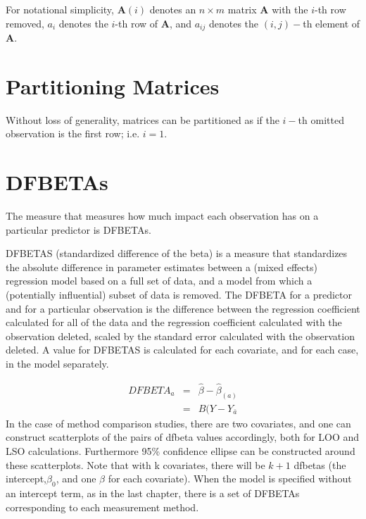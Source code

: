 \documentclass[12pt, a4paper]{report}
\theoremstyle{plain}
\theoremstyle{definition}
\theoremstyle{remark}
\begin{document}
For notational simplicity, $\boldsymbol{A}(i)$ denotes an $n \times m$ matrix $\boldsymbol{A}$ with the $i$-th row
removed, $a_i$ denotes the $i$-th row of $\boldsymbol{A}$, and $a_{ij}$ denotes the $(i, j)-$th element of $\boldsymbol{A}$.

\section{Partitioning Matrices} %
Without loss of generality, matrices can be partitioned as if the $i-$th omitted observation is the first row; i.e. $i=1$.






\section{DFBETAs}
The measure that measures how much impact each observation has on a particular predictor is DFBETAs. 


DFBETAS (standardized difference of the beta) is a measure that standardizes the absolute difference in parameter estimates between a (mixed effects) regression model based on a full set of data, and a model from which a (potentially influential) subset of data is removed. The DFBETA for a predictor and for a particular observation is the difference between the regression coefficient calculated for all of the data and the regression coefficient calculated with the observation deleted, scaled by the standard error calculated with the observation deleted. 
A value for DFBETAS is calculated for each covariate, and for each case, in the model separately.



\begin{eqnarray}
DFBETA_{a} &=& \hat{\beta} - \hat{\beta}_{(a)} \\
&=& B(Y-Y_{\bar{a}}
\end{eqnarray}
In the case of method comparison studies, there are two covariates, and one can construct scatterplots of the pairs of dfbeta values accordingly, both for LOO and LSO calculations. Furthermore 95\% confidence ellipse can be constructed around these scatterplots.
Note that with k covariates, there will be $k+1$ dfbetas (the intercept,$\beta_0$, and one $\beta$ for each covariate). When the model is specified without an intercept term, as in the last chapter, there is a set of DFBETAs corresponding to each measurement method.
\end{document}
